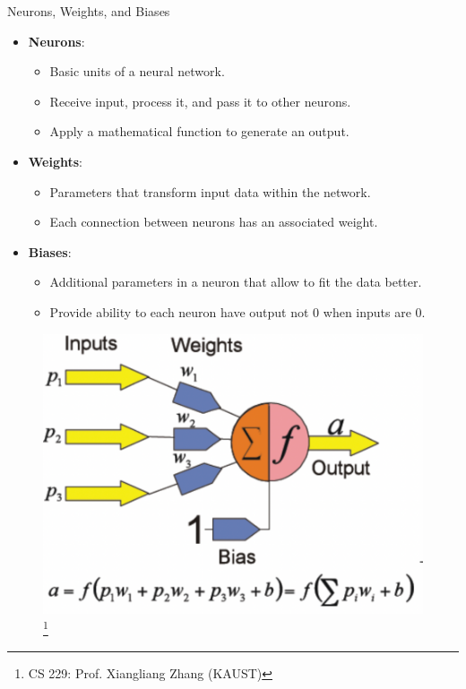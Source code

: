 \documentclass[10pt, hyperref={colorlinks = true,linkcolor = blue}]{beamer}
\begin{document}
{{{\begin{frame}{Neurons, Weights, and Biases}
\begin{itemize}
        \item \textbf{Neurons}:
        \begin{itemize}
            \item Basic units of a neural network.
            \item Receive input, process it, and pass it to other neurons.
            \item Apply a mathematical function to generate an output.
        \end{itemize}
        \item \textbf{Weights}:
        \begin{itemize}
            \item Parameters that transform input data within the network.
            \item Each connection between neurons has an associated weight.
        \end{itemize}
        \item \textbf{Biases}:
        \begin{itemize}
            \item Additional parameters in a neuron that allow to fit the data better.
            \item Provide ability to each neuron have output not 0 when inputs are 0.
        \end{itemize}
    \end{itemize}
    \begin{figure}
        \begin{center}
            \includegraphics[width=0.4\linewidth]{figures/neurons.pdf}\footnote{CS 229: Prof. Xiangliang Zhang (KAUST)}
        \end{center}
    \end{figure}
\end{frame}

}}}
\end{document}
